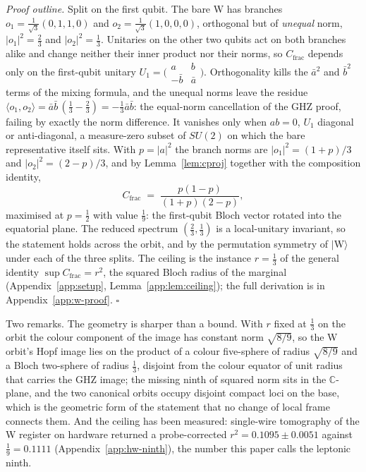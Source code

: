 \emph{Proof outline.} Split on the first qubit. The bare W has branches
$o_1 = \tfrac{1}{\sqrt3}(0,1,1,0)$ and $o_2 = \tfrac{1}{\sqrt3}(1,0,0,0)$, orthogonal but of
\emph{unequal} norm, $\lvert o_1\rvert^2 = \tfrac23$ and $\lvert o_2\rvert^2 = \tfrac13$. Unitaries
on the other two qubits act on both branches alike and change neither their inner product nor
their norms, so $C_{\mathrm{frac}}$ depends only on the first-qubit unitary
$U_1 = \bigl(\begin{smallmatrix} a & b \\ -\bar b & \bar a\end{smallmatrix}\bigr)$. Orthogonality
kills the $\bar a^{2}$ and $\bar b^{2}$ terms of the mixing formula, and the unequal norms leave the
residue $\langle o_1, o_2\rangle = \bar a\bar b\,(\tfrac13 - \tfrac23) = -\tfrac13\bar a\bar b$: the
equal-norm cancellation of the GHZ proof, failing by exactly the norm difference. It vanishes only
when $ab = 0$, $U_1$ diagonal or anti-diagonal, a measure-zero subset of $SU(2)$ on which the bare
representative itself sits. With $p = \lvert a\rvert^2$ the branch norms are
$\lvert o_1\rvert^2 = (1+p)/3$ and $\lvert o_2\rvert^2 = (2-p)/3$, and by Lemma~\ref{lem:cproj}
together with the composition identity,
\[
C_{\mathrm{frac}} \;=\; \frac{p(1-p)}{(1+p)(2-p)},
\]
maximised at $p = \tfrac12$ with value $\tfrac19$: the first-qubit Bloch vector rotated into the
equatorial plane. The reduced spectrum $(\tfrac23,\tfrac13)$ is a local-unitary invariant, so the
statement holds across the orbit, and by the permutation symmetry of $\lvert\mathrm{W}\rangle$ under
each of the three splits. The ceiling is the instance $r = \tfrac13$ of the general identity
$\sup C_{\mathrm{frac}} = r^{2}$, the squared Bloch radius of the marginal (Appendix~\ref{app:setup},
Lemma~\ref{app:lem:ceiling}); the full derivation is in Appendix~\ref{app:w-proof}.
\hfill$\square$

Two remarks. The geometry is sharper than a bound. With $r$ fixed at $\tfrac13$ on the orbit the
colour component of the image has constant norm $\sqrt{8/9}$, so the W orbit's Hopf image lies on
the product of a colour five-sphere of radius $\sqrt{8/9}$ and a Bloch two-sphere of radius
$\tfrac13$, disjoint from the colour equator of unit radius that carries the GHZ image; the missing
ninth of squared norm sits in the $\mathbb{C}$-plane, and the two canonical orbits occupy disjoint
compact loci on the base, which is the geometric form of the statement that no change of local
frame connects them. And the ceiling has been measured: single-wire tomography of the W register on
hardware returned a probe-corrected $r^{2} = 0.1095 \pm 0.0051$ against $\tfrac19 = 0.1111$
(Appendix~\ref{app:hw-ninth}), the number this paper calls the leptonic ninth.

